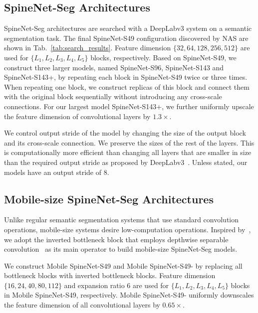 \documentclass[10pt,twocolumn,letterpaper]{article}
\begin{document}
\subsection{SpineNet-Seg Architectures}\label{sec:spinenet_seg_arc}
SpineNet-Seg architectures are searched with a DeepLabv3 system on a semantic segmentation task. The final SpineNet-S49 configuration discovered by NAS are shown in Tab.~\ref{tab:search_results}. Feature dimension $\{32,64,128,256,512\}$ are used for $\{L_1,L_2,L_3,L_4,L_5\}$ blocks, respectively. Based on SpineNet-S49, we construct three larger models, named SpineNet-S96, SpineNet-S143 and SpineNet-S143+, by repeating each block in SpineNet-S49 twice or three times. When repeating one block, we construct replicas of this block and connect them with the original block sequentially without introducing any cross-scale connections. For our largest model SpineNet-S143+, we further uniformly upscale the feature dimension of convolutional layers by $1.3\times$.

We control output stride of the model by changing the size of the output block and its cross-scale connection. We preserve the sizes of the rest of the layers. This is computationally more efficient than changing all layers that are smaller in size than the required output stride as proposed by DeepLabv3~\cite{deeplabv3}. Unless stated, our models have an output stride of 8.

\subsection{Mobile-size SpineNet-Seg Architectures}\label{sec:spinenet_seg_mobile}
Unlike regular semantic segmentation systems that use standard convolution operations, mobile-size systems desire low-computation operations. Inspired by~\cite{mobilenetv2,mobilenetv3,Du2020EfficientSB}, we adopt the inverted bottleneck block that employs depthwise separable convolution~\cite{xception} as its main operator to build mobile-size SpineNet-Seg models.

We construct Mobile SpineNet-S49 and Mobile SpineNet-S49- by replacing all bottleneck blocks with inverted bottleneck blocks. Feature dimension $\{16,24,40,80,112\}$ and expansion ratio 6 are used for $\{L_1,L_2,L_3,L_4,L_5\}$ blocks in Mobile SpineNet-S49, respectively. Mobile SpineNet-S49- uniformly downscales the feature dimension of all convolutional layers by $0.65\times$.
\end{document}
